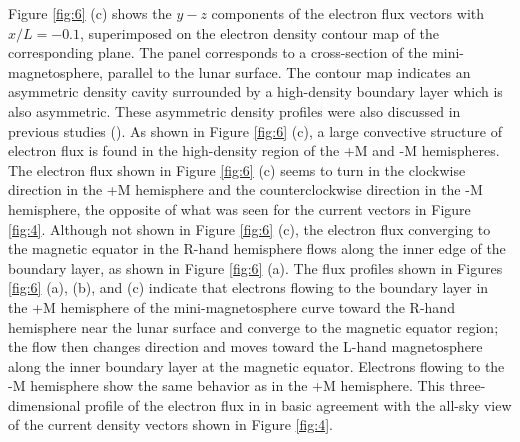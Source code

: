 \documentclass[draft,jgrga]{agutex2015}
\begin{document}
\begin{article}
Figure \ref{fig:6} (c) shows the $y-z$ components of the electron flux 
vectors with $x/L=-0.1$, 
superimposed on the electron density contour map of the corresponding plane.
The panel corresponds to a cross-section of the mini-magnetosphere, 
parallel to the lunar surface.
The contour map indicates an asymmetric density cavity 
surrounded by a high-density boundary layer which is also asymmetric.
These asymmetric density profiles were also discussed in previous studies
(\cite{Deca2014}).
As shown in Figure \ref{fig:6} (c),
a large convective structure of electron flux is found 
in the high-density region of the +M and -M hemispheres.
%
%
The electron flux shown in Figure \ref{fig:6} (c) seems to turn 
in the clockwise direction in the +M hemisphere and the 
counterclockwise direction in the -M hemisphere, the opposite of what was seen for the current vectors in Figure \ref{fig:4}.
%
Although not shown in Figure \ref{fig:6} (c), 
the electron flux converging to the magnetic equator in
the R-hand hemisphere flows along the inner edge of the boundary layer, 
as shown in Figure \ref{fig:6} (a).
The flux profiles shown in Figures \ref{fig:6} (a), (b), and (c) indicate 
that electrons flowing 
to the boundary layer in the +M hemisphere of the mini-magnetosphere
curve toward the R-hand hemisphere 
near the lunar surface and converge to the magnetic equator region; 
the flow then changes direction and moves toward the L-hand magnetosphere
along the inner boundary layer at the magnetic equator.
Electrons flowing to the -M hemisphere show the
same behavior as in the +M hemisphere.
This three-dimensional profile of the electron flux in in basic agreement 
with the all-sky view of the current density vectors 
shown in Figure \ref{fig:4}.


\end{article}
\end{document}
